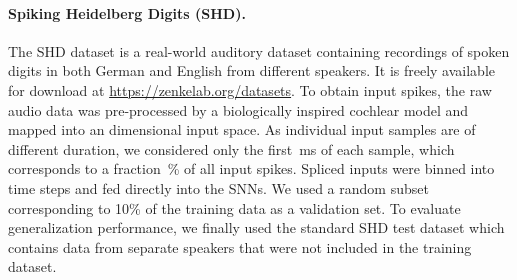 \documentclass[11pt,a4paper]{article}
\begin{document}
\paragraph{Spiking Heidelberg Digits (SHD).} 
The SHD dataset \citep{cramer_heidelberg_2020} is a real-world auditory dataset containing recordings of spoken digits  in both German and English from different speakers.
It is freely available for download at \href{https://zenkelab.org/datasets}{https://zenkelab.org/datasets}. 
To obtain input spikes, the raw audio data was pre-processed by a biologically inspired cochlear model \citep{cramer_heidelberg_2020} and mapped into an  dimensional input space. 
As individual input samples are of different duration, we considered only the first \,ms of each sample, which corresponds to a \mbox{fraction  \%} of all input spikes. 
Spliced inputs were binned into  time steps and fed directly into the \acp{SNN}. 
We used a random subset corresponding to 10\% of the training data as a validation set.
To evaluate generalization performance, we finally used the standard SHD test dataset which contains data from separate speakers that were not included in the training dataset.
\end{document}
